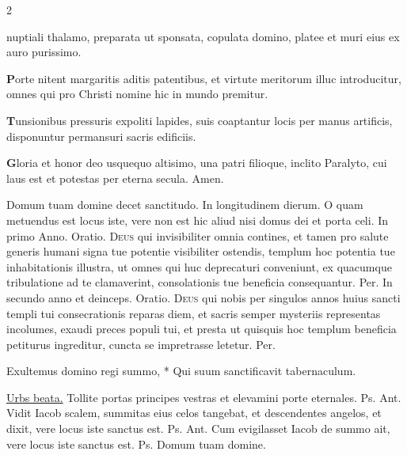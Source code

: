 \begin{multicols*}{2}
{nuptiali thalamo,
preparata ut sponsata,
copulata domino,
platee et muri eius
ex auro purissimo.
\par {\bfseries \color{Blue} P}orte nitent margaritis
aditis patentibus,
et virtute meritorum
illuc introducitur,
omnes qui pro Christi nomine
hic in mundo premitur.
\par {\bfseries \color{Red} T}unsionibus pressuris
expoliti lapides,
suis coaptantur locis
per manus artificis,
disponuntur permansuri
sacris edificiis.
\par {\bfseries \color{Blue} G}loria et honor deo
usquequo altisimo,
una patri filioque,
inclito Paralyto,
cui laus est et potestas
per eterna secula. Amen.
}
\newline \V Domum tuam domine decet sanctitudo. \R In longitudinem dierum.
 O quam metuendus est locus iste, vere non est hic aliud nisi domus dei et porta celi. {\color{Red} In primo Anno. Oratio.}
\lettrine[lines=2]{\zallmancaps \color{Red} D}{eus} qui invisibiliter omnia contines, et tamen pro salute generis humani signa tue potentie visibiliter ostendis, templum hoc potentia tue inhabitationis illustra, ut omnes qui huc deprecaturi conveniunt, ex quacumque tribulatione ad te clamaverint, consolationis tue beneficia consequantur. Per. %
{\color{Red} In secundo anno et deinceps. Oratio.}
\lettrine[lines=2]{\zallmancaps \color{Blue} D}{eus} qui nobis per singulos annos huius sancti templi tui consecrationis reparas diem, et sacris semper mysteriis representas incolumes, exaudi preces populi tui, et presta ut quisquis hoc templum beneficia petiturus ingreditur, cuncta se impretrasse letetur. Per.
\begin{invitatory}
{Exultemus domino regi summo, * Qui suum sanctificavit tabernaculum.}
\end{invitatory}
 \hyperlink{urbs-beata-hierusalem}{Urbs beata.}
 Tollite portas principes vestras et elevamini porte eternales. {\color{Red} Ps.}  {\color{Red} Ant.} Vidit Iacob scalem, summitas eius celos tangebat, et descendentes angelos, et dixit, vere locus iste sanctus est. {\color{Red} Ps.}  {\color{Red} Ant.} Cum evigilasset Iacob de summo ait, vere locus iste sanctus est. {\color{Red} Ps.}  \V Domum tuam domine.

\end{multicols*}
